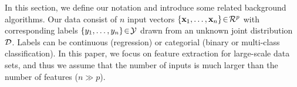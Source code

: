 In this section, we define our notation and introduce some related background algorithms.
Our data consist of $n$ input vectors {$\{\mathbf{x}_1, \ldots, \mathbf{x}_n\}\! \in\! {\cal R}^p$} with corresponding labels $\{y_1, \ldots, y_n\}\!\in\!{\cal Y}$ drawn from an unknown joint distribution ${\cal D}$. Labels can be continuous (regression) or categorial (binary or multi-class classification). In this paper, we focus on feature extraction for large-scale data sets, and thus we assume that the number of inputs is much larger than the number of features ($n \gg p$). %

